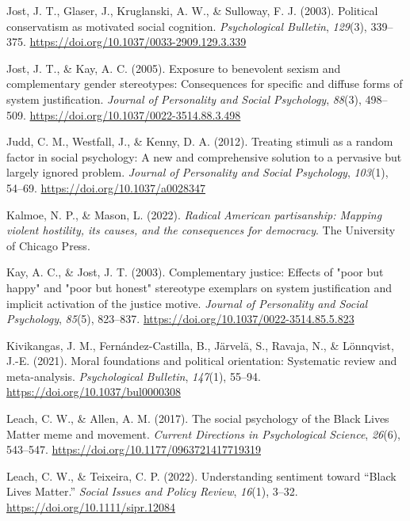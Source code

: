 \documentclass[12pt, letterpaper]{article}
\newenvironment{CSLReferences}[2]{}{}
\begin{document}
\begin{CSLReferences}{1}{0}
\leavevmode{}%
Jost, J. T., Glaser, J., Kruglanski, A. W., \& Sulloway, F. J. (2003).
Political conservatism as motivated social cognition.
\emph{Psychological Bulletin}, \emph{129}(3), 339--375.
\url{https://doi.org/10.1037/0033-2909.129.3.339}

\leavevmode{}%
Jost, J. T., \& Kay, A. C. (2005). Exposure to benevolent sexism and
complementary gender stereotypes: Consequences for specific and diffuse
forms of system justification. \emph{Journal of Personality and Social
Psychology}, \emph{88}(3), 498--509.
\url{https://doi.org/10.1037/0022-3514.88.3.498}

\leavevmode{}%
Judd, C. M., Westfall, J., \& Kenny, D. A. (2012). Treating stimuli as a
random factor in social psychology: {A} new and comprehensive solution
to a pervasive but largely ignored problem. \emph{Journal of Personality
and Social Psychology}, \emph{103}(1), 54--69.
\url{https://doi.org/10.1037/a0028347}

\leavevmode{}%
Kalmoe, N. P., \& Mason, L. (2022). \emph{Radical {American}
partisanship: Mapping violent hostility, its causes, and the
consequences for democracy}. The University of Chicago Press.

\leavevmode{}%
Kay, A. C., \& Jost, J. T. (2003). Complementary justice: Effects of
"poor but happy" and "poor but honest" stereotype exemplars on system
justification and implicit activation of the justice motive.
\emph{Journal of Personality and Social Psychology}, \emph{85}(5),
823--837. \url{https://doi.org/10.1037/0022-3514.85.5.823}

\leavevmode{}%
Kivikangas, J. M., Fernández-Castilla, B., Järvelä, S., Ravaja, N., \&
Lönnqvist, J.-E. (2021). Moral foundations and political orientation:
{Systematic} review and meta-analysis. \emph{Psychological Bulletin},
\emph{147}(1), 55--94. \url{https://doi.org/10.1037/bul0000308}

\leavevmode{}%
Leach, C. W., \& Allen, A. M. (2017). The social psychology of the
{Black Lives Matter} meme and movement. \emph{Current Directions in
Psychological Science}, \emph{26}(6), 543--547.
\url{https://doi.org/10.1177/0963721417719319}

\leavevmode{}%
Leach, C. W., \& Teixeira, C. P. (2022). Understanding sentiment toward
{``{Black Lives Matter}.''} \emph{Social Issues and Policy Review},
\emph{16}(1), 3--32. \url{https://doi.org/10.1111/sipr.12084}


\end{CSLReferences}
\end{document}
